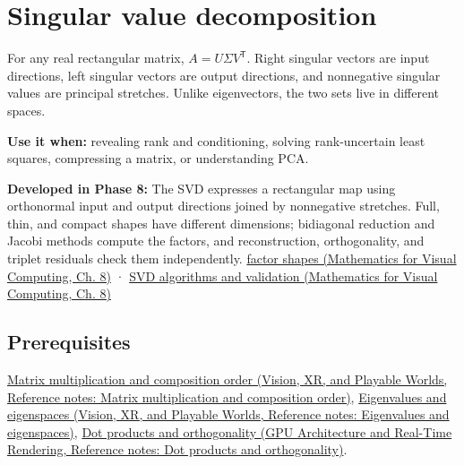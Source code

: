 \hypertarget{appendix-1fad5e7f36fa}{}\label{referencestart:appendix-1fad5e7f36fa}
\section{Singular value decomposition}\label{appendix-1fad5e7f36fa-singular-value-decomposition}

For any real rectangular matrix, \(A=U\Sigma V^\mathsf T\). Right singular vectors are input directions, left singular vectors are output directions, and nonnegative singular values are principal stretches. Unlike eigenvectors, the two sets live in different spaces.

\textbf{Use it when:} revealing rank and conditioning, solving rank-uncertain least squares, compressing a matrix, or understanding PCA.

\textbf{Developed in Phase 8:} The SVD expresses a rectangular map using orthonormal input and output directions joined by nonnegative stretches. Full, thin, and compact shapes have different dimensions; bidiagonal reduction and Jacobi methods compute the factors, and reconstruction, orthogonality, and triplet residuals check them independently. \href{../02-Mathematics-for-Visual-Computing/main.pdf\#nameddest=02-foundations-ii-ch024-full-thin-and-compact-shapes-for-tall-and-wide-matrices}{factor shapes (Mathematics for Visual Computing, Ch. 8)} · \href{../02-Mathematics-for-Visual-Computing/main.pdf\#nameddest=02-foundations-ii-ch024-how-numerical-software-computes-and-checks-an-svd}{SVD algorithms and validation (Mathematics for Visual Computing, Ch. 8)}

\subsection{Prerequisites}\label{appendix-1fad5e7f36fa-prerequisites}

\href{../07-Vision-XR-and-Playable-Worlds/main.pdf\#nameddest=appendix-ab31ef447dbf}{Matrix multiplication and composition order (Vision, XR, and Playable Worlds, Reference notes: Matrix multiplication and composition order)}, \href{../07-Vision-XR-and-Playable-Worlds/main.pdf\#nameddest=appendix-0b3be18411f9}{Eigenvalues and eigenspaces (Vision, XR, and Playable Worlds, Reference notes: Eigenvalues and eigenspaces)}, \href{../06-GPU-Architecture-and-Real-Time-Rendering/main.pdf\#nameddest=appendix-8bc4e8fc547c}{Dot products and orthogonality (GPU Architecture and Real-Time Rendering, Reference notes: Dot products and orthogonality)}.

